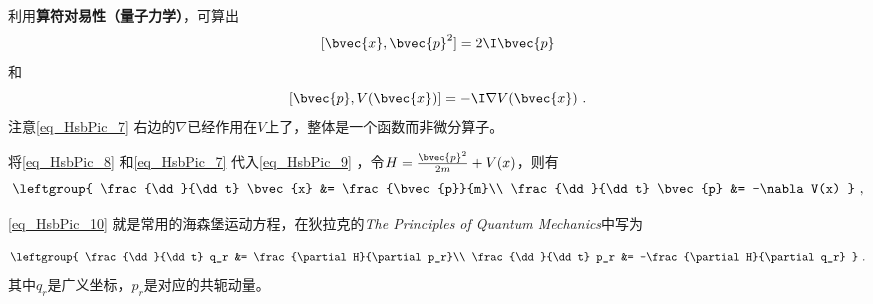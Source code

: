 利用\textbf{算符对易性（量子力学）}，可算出
\begin{equation}\label{eq_HsbPic_8}
    [\bvec{x}, \bvec{p}^2] = 2\I \bvec{p}
\end{equation}
和
\begin{equation}\label{eq_HsbPic_7}
[\bvec{p}, V(\bvec{x})] = -\I\nabla V(\bvec{x})~.
\end{equation}
注意\autoref{eq_HsbPic_7} 右边的$\nabla$已经作用在$V$上了，整体是一个函数而非微分算子。

将\autoref{eq_HsbPic_8} 和\autoref{eq_HsbPic_7} 代入\autoref{eq_HsbPic_9} ，令$H=\frac{\bvec{p}^2}{2m}+V(x)$，则有
\begin{equation}\label{eq_HsbPic_10}
\leftgroup{
    \frac{\dd}{\dd t} \bvec{x} &= \frac{\bvec{p}}{m}\\
    \frac{\dd}{\dd t} \bvec{p} &= -\nabla V(x)
}~,
\end{equation}


\autoref{eq_HsbPic_10} 就是常用的海森堡运动方程，在狄拉克的\textsl{The Principles of Quantum Mechanics}中写为

\begin{equation}\label{eq_HsbPic_11}
\leftgroup{
    \frac{\dd}{\dd t} q_r &= \frac{\partial H}{\partial p_r}\\
    \frac{\dd}{\dd t} p_r &= -\frac{\partial H}{\partial q_r} 
}~.
\end{equation}
其中$q_r$是广义坐标，$p_r$是对应的共轭动量。












